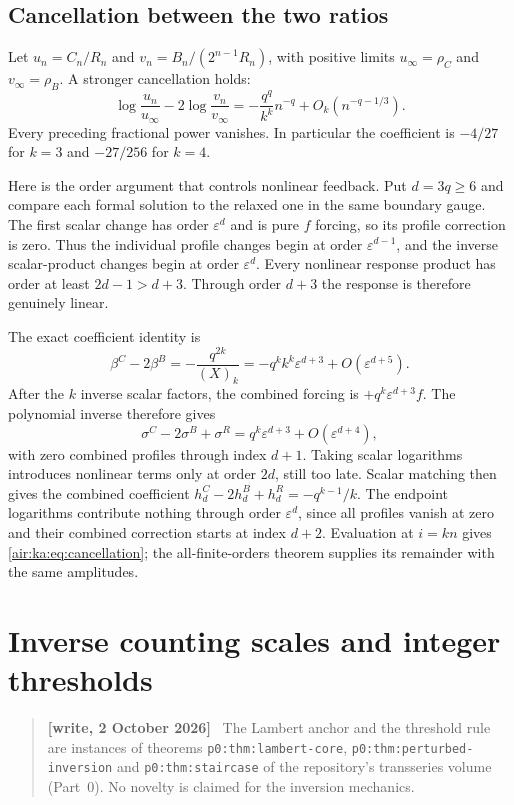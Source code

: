 \documentclass[11pt,letterpaper]{article}
\numberwithin{equation}{section}
\theoremstyle{remark}
\newcommand{\eps}{\varepsilon}
\newenvironment{writenote}{\par\smallskip\begin{quote}\small\textbf{[write, 2 October 2026]}\ }{\end{quote}\smallskip}
\newcommand{\repopath}[1]{\nolinkurl{#1}}
\begin{document}
\subsection{Cancellation between the two ratios}
Let $u_n=C_n/R_n$ and $v_n=B_n/(2^{n-1}R_n)$, with positive limits $u_\infty=\rho_C$ and $v_\infty=\rho_B$. A stronger cancellation holds:
\begin{equation}\label{air:ka:eq:cancellation}
 \log\frac{u_n}{u_\infty}-2\log\frac{v_n}{v_\infty}
 =-\frac{q^q}{k^k}n^{-q}+O_k(n^{-q-1/3}).
\end{equation}
Every preceding fractional power vanishes. In particular the coefficient is $-4/27$ for $k=3$ and $-27/256$ for $k=4$.

Here is the order argument that controls nonlinear feedback. Put $d=3q\ge6$ and compare each formal solution to the relaxed one in the same boundary gauge. The first scalar change has order $\eps^d$ and is pure $f$ forcing, so its profile correction is zero. Thus the individual profile changes begin at order $\eps^{d-1}$, and the inverse scalar-product changes begin at order $\eps^d$. Every nonlinear response product has order at least $2d-1>d+3$. Through order $d+3$ the response is therefore genuinely linear.

The exact coefficient identity is
\[
 \beta^C-2\beta^B=-\frac{q^{2k}}{(X)_k}
 =-q^kk^k\eps^{d+3}+O(\eps^{d+5}).
\]
After the $k$ inverse scalar factors, the combined forcing is $+q^k\eps^{d+3}f$. The polynomial inverse therefore gives
\[
 \sigma^C-2\sigma^B+\sigma^R
 =q^k\eps^{d+3}+O(\eps^{d+4}),
\]
with zero combined profiles through index $d+1$. Taking scalar logarithms introduces nonlinear terms only at order $2d$, still too late. Scalar matching then gives the combined coefficient
$h_d^C-2h_d^B+h_d^R=-q^{k-1}/k$. The endpoint logarithms contribute nothing through order $\eps^d$, since all profiles vanish at zero and their combined correction starts at index $d+2$. Evaluation at $i=kn$ gives \eqref{air:ka:eq:cancellation}; the all-finite-orders theorem supplies its remainder with the same amplitudes.

\section{Inverse counting scales and integer thresholds}\label{air:ka:sec:inverse}
\begin{writenote}
The Lambert anchor and the threshold rule are instances of theorems \repopath{p0:thm:lambert-core}, \repopath{p0:thm:perturbed-inversion} and \repopath{p0:thm:staircase} of the repository's transseries volume (Part~0). No novelty is claimed for the inversion mechanics.
\end{writenote}
\end{document}
